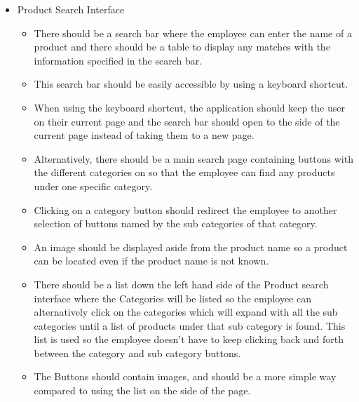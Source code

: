 \begin{itemize}
	\item Product Search Interface
	\begin{itemize}
		\item There should be a search bar where the employee can enter the name of a product and there should be a table to display any matches with the information specified in the search bar.
		\item This search bar should be easily accessible by using a keyboard shortcut.
		\item When using the keyboard shortcut, the application should keep the user on their current page and the search bar should open to the side of the current page instead of taking them to a new page.
		\item Alternatively, there should be a main search page containing buttons with the different categories on so that the employee can find any products under one specific category.
		\item Clicking on a category button should redirect the employee to another selection of buttons named by the sub categories of that category.
		\item An image should be displayed aside from the product name so a product can be located even if the product name is not known.
		\item There should be a list down the left hand side of the Product search interface where the Categories will be listed so the employee can alternatively click on the categories which will expand with all the sub categories until a list of products under that sub category is found. This list is used so the employee doesn’t have to keep clicking back and forth between the category and sub category buttons.
		\item The Buttons should contain images, and should be a more simple way compared to using the list on the side of the page.
	\end{itemize}


\end{itemize}
